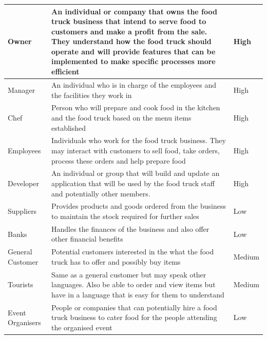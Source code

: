 \begin{center}
\begin{longtable}{|p{3cm}|p{6.6cm}|p{2cm}|}
Owner & An individual or company that owns the food truck business that intend to serve food to customers and make a profit from the sale. They understand how the food truck should operate and will provide features that can be implemented to make specific processes more efficient & High \\\hline
Manager & An individual who is in charge of the employees and the facilities they work in & High \\\hline
Chef & Person who will prepare and cook food in the kitchen and the food truck based on the menu items established & High \\\hline
Employees & Individuals who work for the food truck business. They may interact with customers to sell food, take orders, process these orders and help prepare food & High \\\hline
Developer & An individual or group that will build and update an application that will be used by the food truck staff and potentially other members. & High \\\hline
Suppliers & Provides products and goods ordered from the business to maintain the stock required for further sales & Low \\\hline
Banks & Handles the finances of the business and also offer other financial benefits & Low \\\hline
General Customer & Potential customers interested in the what the food truck has to offer and possibly buy items & Medium \\\hline
Tourists & Same as a general customer but may speak other languages. Also be able to order and view items but have in a language that is easy for them to understand & Medium \\\hline
Event Organisers & People or companies that can potentially hire a food truck business to cater food for the people attending the organised event & Low \\
\end{longtable}
\end{center}
\newpage
